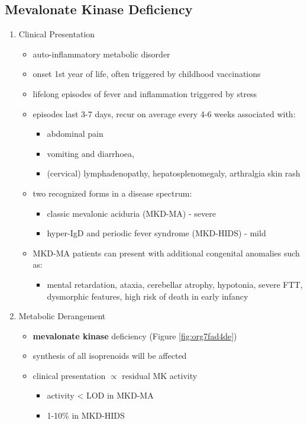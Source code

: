 \documentclass[12pt]{scrartcl}
\begin{document}
\subsection{Mevalonate Kinase Deficiency}
\label{sec:org021d24c}
\begin{enumerate}
\item Clinical Presentation
\label{sec:orga145a5b}
\begin{itemize}
\item auto-inflammatory metabolic disorder
\item onset 1st year of life, often triggered by childhood vaccinations
\item lifelong episodes of fever and inflammation triggered by stress
\item episodes last 3-7 days, recur on average every 4-6 weeks associated with:
\begin{itemize}
\item abdominal pain
\item vomiting and diarrhoea,
\item (cervical) lymphadenopathy, hepatosplenomegaly, arthralgia skin rash
\end{itemize}
\item two recognized forms in a disease spectrum:
\begin{itemize}
\item classic mevalonic aciduria (MKD-MA) - severe
\item hyper-IgD and periodic fever syndrome (MKD-HIDS) - mild
\end{itemize}

\item MKD-MA patients can present with additional congenital anomalies
such as:
\begin{itemize}
\item mental retardation, ataxia, cerebellar atrophy, hypotonia, severe
FTT, dysmorphic features, high risk of death in early infancy
\end{itemize}
\end{itemize}

\item Metabolic Derangement
\label{sec:org3045ab3}
\begin{itemize}
\item \textbf{mevalonate kinase} deficiency (Figure \ref{fig:org7fad4de})
\end{itemize}
\begin{itemize}
\item synthesis of all isoprenoids will be affected
\item clinical presentation \(\propto\) residual MK activity
\begin{itemize}
\item activity < LOD in MKD-MA
\item 1-10\% in MKD-HIDS
\end{itemize}
\end{itemize}


\end{enumerate}
\end{document}
